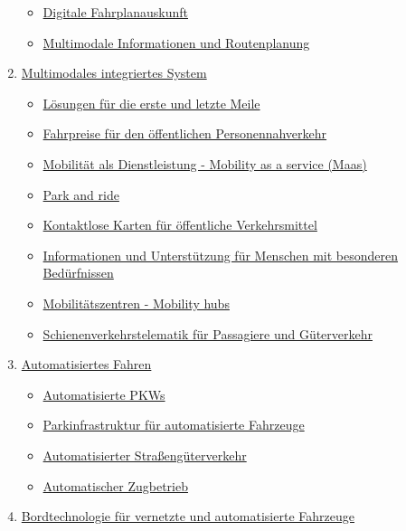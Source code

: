 \documentclass[
]{book}
\providecommand{\tightlist}{%
  \setlength{\itemsep}{0pt}\setlength{\parskip}{0pt}}
\begin{document}
\begin{enumerate}
  \begin{itemize}
  \tightlist
  \item
    \protect\hyperlink{djp}{Digitale Fahrplanauskunft}\\
  \item
    \protect\hyperlink{info_and_route_planning}{Multimodale Informationen und Routenplanung}\\
  \end{itemize}
\item
  \protect\hyperlink{multimodal}{Multimodales integriertes System}

  \begin{itemize}
  \tightlist
  \item
    \protect\hyperlink{flms}{Lösungen für die erste und letzte Meile}\\
  \item
    \protect\hyperlink{dist_time_fares}{Fahrpreise für den öffentlichen Personennahverkehr}\\
  \item
    \protect\hyperlink{maas}{Mobilität als Dienstleistung - Mobility as a service (Maas)}\\
  \item
    \protect\hyperlink{p_r}{Park and ride}\\
  \item
    \protect\hyperlink{contactless_cards}{Kontaktlose Karten für öffentliche Verkehrsmittel}\\
  \item
    \protect\hyperlink{special_needs}{Informationen und Unterstützung für Menschen mit besonderen Bedürfnissen}\\
  \item
    \protect\hyperlink{mobility_hubs}{Mobilitätszentren - Mobility hubs}\\
  \item
    \protect\hyperlink{rail_telematics}{Schienenverkehrstelematik für Passagiere und Güterverkehr}\\
  \end{itemize}
\item
  \protect\hyperlink{connected}{Automatisiertes Fahren}

  \begin{itemize}
  \tightlist
  \item
    \protect\hyperlink{av}{Automatisierte PKWs}
  \item
    \protect\hyperlink{parking_av}{Parkinfrastruktur für automatisierte Fahrzeuge}
  \item
    \protect\hyperlink{automated_road_freight}{Automatisierter Straßengüterverkehr}
  \item
    \protect\hyperlink{automatic_train}{Automatischer Zugbetrieb}\\
  \end{itemize}
\item
  \protect\hyperlink{onboard}{Bordtechnologie für vernetzte und automatisierte Fahrzeuge}


\end{enumerate}
\end{document}
